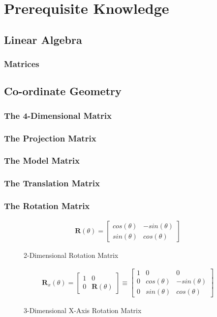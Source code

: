 \chapter{Prerequisite Knowledge}
\section{Linear Algebra}
\subsection{Matrices}
\section{Co-ordinate Geometry}
\subsection{The 4-Dimensional Matrix}
\subsection{The Projection Matrix}
\subsection{The Model Matrix}
\subsection{The Translation Matrix}
\subsection{The Rotation Matrix}
\begin{figure}[h!]
\begin{gather} 
\textbf{R}(\theta) = 
\begin{bmatrix}
cos(\theta) & -sin(\theta) \\
sin(\theta) & cos(\theta)
\end{bmatrix}
\end{gather}
\label{equation:2dRotMat} 
\caption{2-Dimensional Rotation Matrix}
\end{figure}

\begin{figure}[h!]
	\begin{gather} 
\textbf{R}_x(\theta) = 
\begin{bmatrix}
1 & 0 \\
0 & \textbf{R}(\theta)
\end{bmatrix}
\equiv
\begin{bmatrix}
1 & 0 & 0 \\
0 & cos(\theta) & -sin(\theta)\\
0 & sin(\theta) & cos(\theta) 
\end{bmatrix}
\end{gather}
\label{equation:3dXRotMat} 
\caption{3-Dimensional X-Axis Rotation Matrix}
\end{figure}

